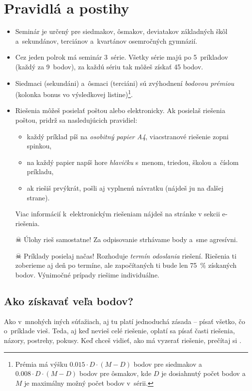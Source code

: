 \pagestyle{rules}

\section{Pravidlá a postihy}
\begin{itemize}
	\item Seminár je určený pre siedmakov, ôsmakov, deviatakov základných škôl a~sekundánov, terciánov a~kvartánov osemročných gymnázií. 

	\item Cez jeden polrok má seminár 3~série. Všetky série majú po 5~príkladov (každý za 9~bodov), za každú sériu tak môžeš získať 45 bodov.

	\item Siedmaci (sekundáni) a~ôsmaci (terciáni) sú zvýhodnení \emph{bodovou prémiou} (kolonka bonus vo výsledkovej listine)\footnote{%
		Prémia má výšku $\num{0.015} \cdot D \cdot (M - D)$ bodov pre siedmakov a $\num{0.008} \cdot D \cdot (M - D)$ bodov pre ôsmakov,
		kde $D$ je dosiahnutý počet bodov a $M$ je maximálny možný počet bodov v~sérii.}.

	\item Riešenia môžeš posielať poštou alebo elektronicky. Ak posielaš riešenia poštou, pridrž sa nasledujúcich pravidiel:
		\begin{itemize}
			\item každý príklad píš na \emph{osobitný papier A4}, viacstranové riešenie zopni spinkou,
			\item na každý papier napíš hore \emph{hlavičku} s~menom, triedou, školou a~číslom príkladu,
			\item ak riešiš prvýkrát, pošli aj vyplnenú návratku (nájdeš ju na ďalšej strane).
		\end{itemize}
	Viac informácií k~elektronickým riešeniam nájdeš na stránke \URL{\seminarURL} v sekcii e-riešenia.

	\item[$\skull$] Úlohy rieš samostatne! Za odpisovanie strhávame body a~sme agresívni. 

	\item[$\skull$] Príklady posielaj načas! Rozhoduje \emph{termín odoslania} riešení. Riešenia ti zoberieme aj deň po termíne, ale započítaných ti bude len \SI{75}{\percent} získaných bodov.
		Výnimočné prípady riešime individuálne.
\end{itemize}

\subsection{Ako získavať veľa bodov?}
	Ako v~mnohých iných súťažiach, aj tu platí jednoduchá zásada -- písať všetko, čo o~príklade vieš. Teda, aj keď nevieš celé riešenie, oplatí sa písať časti
    riešenia, názory, postrehy, pokusy. Keď chceš vidieť, ako má vyzerať riešenie, prečítaj si . 

